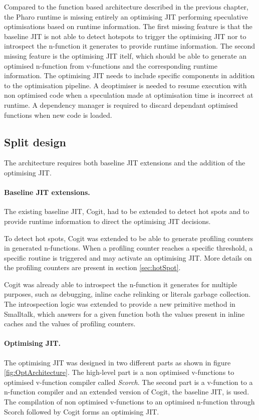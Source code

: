 \documentclass[a4paper,12pt,twoside]{../includes/ThesisStyle}
\begin{document}
Compared to the function based architecture described in the previous chapter, the Pharo runtime is missing entirely an optimising JIT performing speculative optimisations based on runtime information. The first missing feature is that the baseline JIT is not able to detect hotspots to trigger the optimising JIT nor to introspect the n-function it generates to provide runtime information. The second missing feature is the optimising JIT itelf, which should be able to generate an optimised n-function from v-functions and the corresponding runtime information. The optimising JIT needs to include specific components in addition to the optimisation pipeline. A deoptimiser is needed to resume execution with non optimised code when a speculation made at optimisation time is incorrect at runtime. A dependency manager is required to discard dependant optimised functions when new code is loaded.

\subsection{Split design}
\label{sec:splitDesign}

The architecture requires both baseline JIT extensions and the addition of the optimising JIT.

\paragraph{Baseline JIT extensions.}
The existing baseline JIT, Cogit, had to be extended to detect hot spots and to provide runtime information to direct the optimising JIT decisions. 

To detect hot spots, Cogit was extended to be able to generate profiling counters in generated n-functions. When a profiling counter reaches a specific threshold, a specific routine is triggered and may activate an optimising JIT. More details on the profiling counters are present in section \ref{sec:hotSpot}.

Cogit was already able to introspect the n-function it generates for multiple purposes, such as debugging, inline cache relinking or literals garbage collection. The introspection logic was extended to provide a new primitive method in Smalltalk, which answers for a given function both the values present in inline caches and the values of profiling counters.

\paragraph{Optimising JIT.}
The optimising JIT was designed in two different parts as shown in figure \ref{fig:OptArchitecture}. The high-level part is a non optimised v-functions to optimised v-function compiler called \emph{Scorch}. The second part is a v-function to a n-function compiler and an extended version of Cogit, the baseline JIT, is used. The compilation of non optimised v-functions to an optimised n-function through Scorch followed by Cogit forms an optimising JIT.
\end{document}
